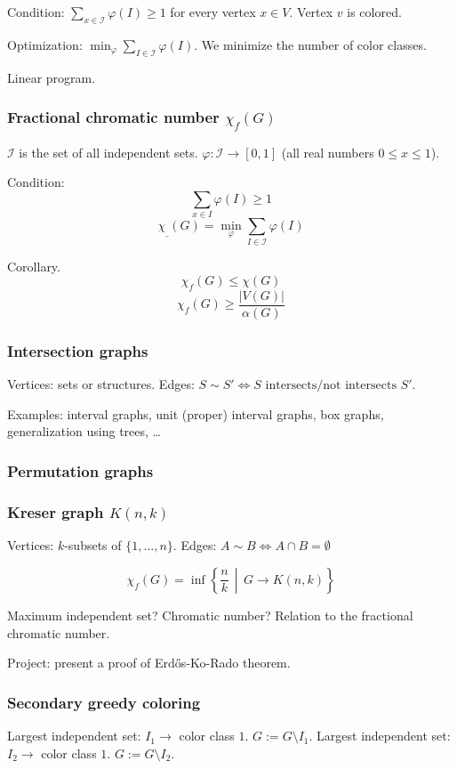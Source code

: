 \documentclass[12pt,a4paper]{article} \usepackage{fontspec}
\begin{document}
Condition: \(\sum_{x \in \mathcal{I}} \varphi(I) \geq 1\) for every vertex \(x
\in V\).  Vertex \(v\) is colored.

Optimization: \(\min_{\varphi} \sum_{I \in \mathcal{I}} \varphi(I)\).  We
minimize the number of color classes.

Linear program.

\subsubsection{Fractional chromatic number \(\chi_f(G)\)} \(\mathcal{I}\) is the
set of all independent sets.  \(\varphi: \mathcal{I} \to [0, 1]\) (all real
numbers \(0 \leq x \leq 1\)).

Condition: \[\sum_{x \in I} \varphi(I) \geq 1\] \[\chi_{\_}(G) = \min_\varphi
\sum_{I \in \mathcal{I}} \varphi(I)\]

Corollary. \[\chi_f(G) \leq \chi(G)\] \[\chi_f(G) \geq
\frac{|V(G)|}{\alpha(G)}\]

\subsubsection{Intersection graphs} Vertices: sets or structures.  Edges: \(S
\sim S' \Leftrightarrow S \text{ intersects/not intersects } S'\).

Examples: interval graphs, unit (proper) interval graphs, box graphs,
generalization using trees, …

\subsubsection{Permutation graphs} \subsubsection{Kreser graph \(K(n, k)\)}
Vertices: \(k\)-subsets of \(\{1, \dots, n\}\).  Edges: \(A \sim B
\Leftrightarrow A \cap B = \emptyset\)

\[\chi_f(G) = \inf\left\{ \frac{n}{k} \,\middle|\, G \to K(n, k)\right\}\]

Maximum independent set? Chromatic number? Relation to the fractional chromatic
number.

Project: present a proof of Erdős-Ko-Rado theorem.

\subsubsection{Secondary greedy coloring} Largest independent set: \(I_1 \to\)
color class \(1\).  \(G := G \setminus I_1\).  Largest independent set: \(I_2
\to\) color class \(1\).  \(G := G \setminus I_2\).
\end{document}
